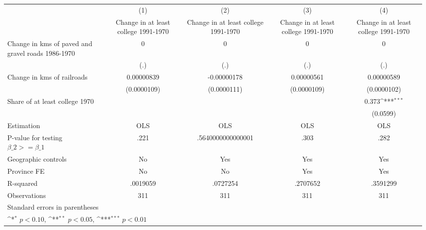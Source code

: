 {
\def\sym#1{\ifmmode^{#1}\else\(^{#1}\)\fi}
\begin{tabular}{l*{4}{c}}
\hline\hline
                    &\multicolumn{1}{c}{(1)}&\multicolumn{1}{c}{(2)}&\multicolumn{1}{c}{(3)}&\multicolumn{1}{c}{(4)}\\
                    &\multicolumn{1}{c}{Change in at least college 1991-1970}&\multicolumn{1}{c}{Change in at least college 1991-1970}&\multicolumn{1}{c}{Change in at least college 1991-1970}&\multicolumn{1}{c}{Change in at least college 1991-1970}\\
\hline
Change in kms of paved and gravel roads 1986-1970&           0         &           0         &           0         &           0         \\
                    &         (.)         &         (.)         &         (.)         &         (.)         \\
[1em]
Change in kms of railroads&  0.00000839         & -0.00000178         &  0.00000561         &  0.00000589         \\
                    & (0.0000109)         & (0.0000111)         & (0.0000109)         & (0.0000102)         \\
[1em]
Share of at least college 1970&                     &                     &                     &       0.373\sym{***}\\
                    &                     &                     &                     &    (0.0599)         \\
\hline
Estimation          &         OLS         &         OLS         &         OLS         &         OLS         \\
P-value for testing $\beta\_2 >= \beta\_1$&        .221         &.5640000000000001         &        .303         &        .282         \\
Geographic controls &          No         &         Yes         &         Yes         &         Yes         \\
Province FE         &          No         &          No         &         Yes         &         Yes         \\
R-squared           &    .0019059         &    .0727254         &    .2707652         &    .3591299         \\
Observations        &         311         &         311         &         311         &         311         \\
\hline\hline
\multicolumn{5}{l}{\footnotesize Standard errors in parentheses}\\
\multicolumn{5}{l}{\footnotesize \sym{*} \(p<0.10\), \sym{**} \(p<0.05\), \sym{***} \(p<0.01\)}\\
\end{tabular}
}
